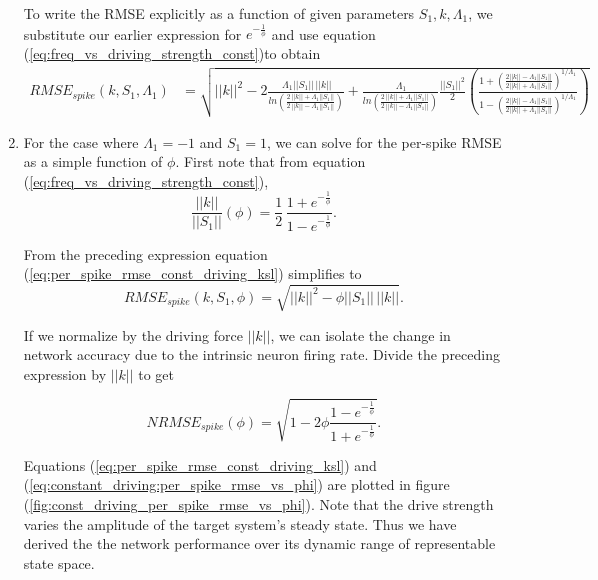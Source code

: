 \begin{enumerate}
To write the RMSE explicitly as a function of given parameters $S_1, k, \Lambda_1$, we substitute our earlier expression for $e^{-\frac{1}{\phi}}$ and use equation (\ref{eq:freq_vs_driving_strength_const})to obtain
\begin{align}
\label{eq:per_spike_rmse_const_driving_ksl}
RMSE_{spike}(k, S_1, \Lambda_1) &=
\sqrt
{	
	||k||^2 -
	 2
	 \frac{ \, \Lambda_1 ||S_1|| \, ||k||}
	 {
	 	ln\left(\frac{2\,||k|| + \Lambda_1 ||S_1||}{2\,||k|| - \Lambda_1 ||S_1||}  \right)
	  }
	  + 
	  \frac{ \, \Lambda_1 }
	 {
	 	ln\left(\frac{2\,||k|| + \Lambda_1 ||S_1||}{2\,||k|| - \Lambda_1 ||S_1||}  \right)
	  }
	  \frac{||S_1||^2}{2}
	  \left(
	  \frac
	  {1 + \left(\frac{2 ||k||-\Lambda_1 ||S_1||}{2 ||k||+\Lambda_1 ||S_1||}\right)^{1/\Lambda_1} }
  	  {1 - \left(\frac{2 ||k||-\Lambda_1 ||S_1||}{2 ||k||+\Lambda_1 ||S_1||}\right)^{1/\Lambda_1} }
	  \right)
}
\end{align}

\item For the case where $\Lambda_1=-1$ and $S_1=1$, we can solve for the per-spike RMSE as a simple function of $\phi$.  First note that from equation (\ref{eq:freq_vs_driving_strength_const}),
$$
\frac{||k||}{||S_1||}\left(\phi\right) = 
\frac{1}{2} \,
\frac
{1+e^{-\frac{1}{\phi} }}
{1 - e^{-\frac{1}{\phi} }}.
$$

From the preceding expression equation (\ref{eq:per_spike_rmse_const_driving_ksl}) simplifies to 
$$
RMSE_{spike}\left(k,S_1,\phi\right) =
\sqrt
{
	||k||^2 -
	    \phi ||S_1|| \, ||k||
}.
$$	   

If we normalize by the driving force $||k||$, we can isolate the change in network accuracy due to the intrinsic neuron firing rate. Divide the preceding expression by $||k||$ to get

\begin{equation}
\label{eq:constant_driving:per_spike_rmse_vs_phi}
NRMSE_{spike}\left(\phi\right) =
\sqrt
{
	1 -
	    2 \phi \frac
{1 - e^{-\frac{1}{\phi} }}
{1 + e^{-\frac{1}{\phi} }} 
}.
\end{equation}



Equations (\ref{eq:per_spike_rmse_const_driving_ksl}) and (\ref{eq:constant_driving:per_spike_rmse_vs_phi}) are plotted in figure (\ref{fig:const_driving_per_spike_rmse_vs_phi}). Note that the drive strength varies the amplitude of the target system's steady state. Thus we have derived the the network performance over its dynamic range of representable state space. 




\end{enumerate}
